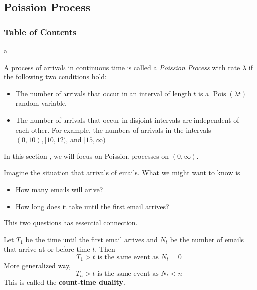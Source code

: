 \documentclass[8pt]{beamer}
\newcommand{\tb}[1]{\textbf{#1}}
\newcommand{\ti}[1]{\textit{#1}}
\newcommand{\mypois}[1]{\operatorname{Pois}(#1)}
\begin{document}
\subsection{Poission Process}

\begin{frame}
    \frametitle{Table of Contents}
    \tableofcontents[currentsubsection]
\end{frame}

\begin{frame}{a}
    \begin{definition}
        A process of arrivals in continuous time is called a \ti{Poission Process} with rate $\lambda$ if the following two conditions hold:

        \begin{itemize}
            \item The number of arrivals that occur in an interval of length $t$ is a $\mypois{\lambda t}$ random variable.
            \item The number of arrivals that occur in disjoint intervals are independent of each other. For example, the numbers of arrivals in the intervals $(0,10), [10,12)$, and $[15, \infty)$
        \end{itemize}
    \end{definition}

    In this section , we will focus on Poission processes on $(0,\infty)$.

    Imagine the situation that arrivals of emails. What we might want to know is
    \begin{itemize}
        \item How many emails will arive?
        \item How long does it take until the first email arrives?
    \end{itemize}
    This two questions has essential connection.

    \smallskip
    Let $T_1$ be the time until the first email arrives and $N_t$ be the number of emails that arrive at or before time $t$. Then 
    \[
        T_1>t \text{ is the same event as } N_t =0
    \]
    More generalized way, 
    \[
        T_n >t \text{ is the same event as } N_t < n
    \]
    This is called the \tb{count-time duality}.
\end{frame}
\end{document}
